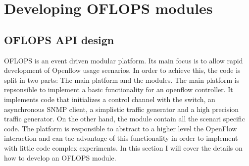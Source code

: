 \documentclass{book}
\begin{document}

  \chapter{Developing OFLOPS modules}

\section{OFLOPS API design}

OFLOPS is an event driven modular platform. Its main focus is to allow rapid development
of Openflow usage scenarios. In order to achieve this, the code is split in two parts: The main 
platform and the modules. The main platform is repsonsible to implement a basic functionality for an
openflow controller. It implements code that initializes a  control channel with the switch,
an asynchronous SNMP client, a simplistic traffic generator and a high precision traffic generator. On the other
hand, the module contain all the scenari specific code. The platform is responsible to abstract to a higher 
level the OpenFlow interaction and can tae advantage of this functionality in order to implement with little
code complex experiments. In this section I will cover the details on how to develop an OFLOPS module.
\end{document}
